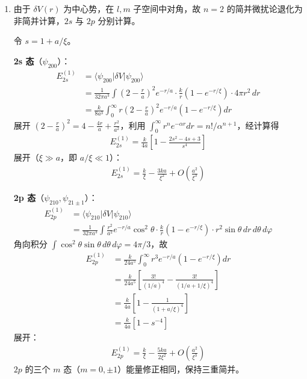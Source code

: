\begin{enumerate}
{\begin{enumerate}
		\item 由于 $\delta V(r)$ 为中心势，在 $l,m$ 子空间中对角，故 $n=2$ 的简并微扰论退化为非简并计算，$2s$ 与 $2p$ 分别计算。

		令 $s=1+a/\xi$。

		\textbf{2s 态}（$\psi_{200}$）：
		\begin{align*}
			E_{2s}^{(1)}&=\langle\psi_{200}|\delta V|\psi_{200}\rangle\\
			&=\frac{1}{32\pi a^3}\int\left(2-\frac{r}{a}\right)^2 e^{-r/a}\cdot\frac{k}{r}\left(1-e^{-r/\xi}\right)\cdot 4\pi r^2\,dr\\
			&=\frac{k}{8a^3}\int_0^{\infty}r\left(2-\frac{r}{a}\right)^2 e^{-r/a}\left(1-e^{-r/\xi}\right)dr
		\end{align*}
		展开 $\left(2-\frac{r}{a}\right)^2=4-\frac{4r}{a}+\frac{r^2}{a^2}$，利用 $\int_0^{\infty}r^n e^{-\alpha r}dr=n!/\alpha^{n+1}$，经计算得
		\begin{align*}
			E_{2s}^{(1)}=\frac{k}{4a}\left[1-\frac{2s^2-4s+3}{s^4}\right]
		\end{align*}
		展开（$\xi\gg a$，即 $a/\xi\ll 1$）：
		\begin{align*}
			E_{2s}^{(1)}=\frac{k}{\xi}-\frac{3ka}{\xi^2}+O\!\left(\frac{a^2}{\xi^3}\right)
		\end{align*}

		\textbf{2p 态}（$\psi_{210},\psi_{21\pm1}$）：
		\begin{align*}
			E_{2p}^{(1)}&=\langle\psi_{210}|\delta V|\psi_{210}\rangle\\
			&=\frac{1}{32\pi a^3}\int\frac{r^2}{a^2}e^{-r/a}\cos^2\theta\cdot\frac{k}{r}\left(1-e^{-r/\xi}\right)\cdot r^2\sin\theta\,dr\,d\theta\,d\varphi
		\end{align*}
		角向积分 $\int\cos^2\theta\sin\theta\,d\theta\,d\varphi=4\pi/3$，故
		\begin{align*}
			E_{2p}^{(1)}&=\frac{k}{24a^5}\int_0^{\infty}r^3 e^{-r/a}\left(1-e^{-r/\xi}\right)dr\\
			&=\frac{k}{24a^5}\left[\frac{3!}{(1/a)^4}-\frac{3!}{(1/a+1/\xi)^4}\right]\\
			&=\frac{k}{4a}\left[1-\frac{1}{(1+a/\xi)^4}\right]\\
			&=\frac{k}{4a}\left[1-s^{-4}\right]
		\end{align*}
		展开：
		\begin{align*}
			E_{2p}^{(1)}=\frac{k}{\xi}-\frac{5ka}{2\xi^2}+O\!\left(\frac{a^2}{\xi^3}\right)
		\end{align*}
		$2p$ 的三个 $m$ 态（$m=0,\pm1$）能量修正相同，保持三重简并。


\end{enumerate}}
\end{enumerate}
